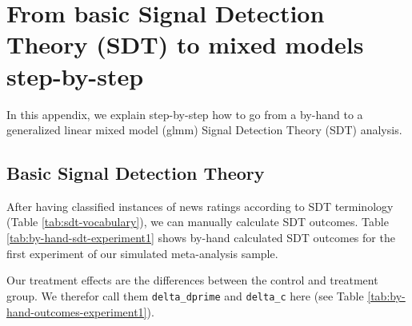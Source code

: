 \documentclass[
  man,mask,floatsintext]{apa6}
\begin{document}
\newpage

\appendix


\section{From basic Signal Detection Theory (SDT) to mixed models step-by-step}\label{step-by-step}

In this appendix, we explain step-by-step how to go from a by-hand to a generalized linear mixed model (glmm) Signal Detection Theory (SDT) analysis.

\subsection{Basic Signal Detection Theory}\label{basic-signal-detection-theory}

\FloatBarrier

After having classified instances of news ratings according to SDT terminology (Table \ref{tab:sdt-vocabulary}), we can manually calculate SDT outcomes. Table \ref{tab:by-hand-sdt-experiment1} shows by-hand calculated SDT outcomes for the first experiment of our simulated meta-analysis sample.

\begin{table}
\centering
\caption{\label{tab:by-hand-sdt-experiment1}SDT outcomes calculated by-hand for Experiment 1 of simulated data.}
\centering
{}
\end{table}

Our treatment effects are the differences between the control and treatment group. We therefor call them \texttt{delta\_dprime} and \texttt{delta\_c} here (see Table \ref{tab:by-hand-outcomes-experiment1}).

\begin{table}
\centering
\caption{\label{tab:by-hand-outcomes-experiment1}SDT treatment effects calculated by-hand for Experiment 1 of simulated data.}
\centering
{}
\end{table}
\end{document}
